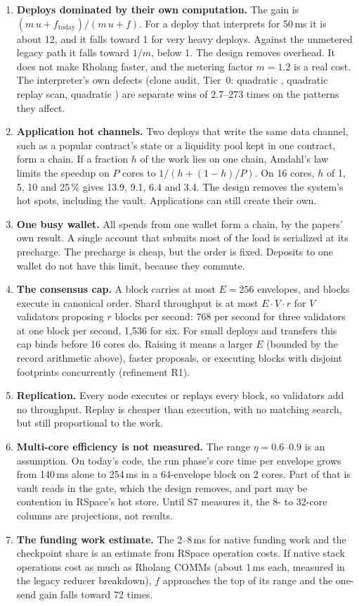 \documentclass[11pt]{article}
\newcommand{\code}{\path}
\begin{document}
\begin{enumerate}
\item \textbf{Deploys dominated by their own computation.} The gain is $(m\,u + f_{\mathrm{today}})/(m\,u + f)$. For a deploy that interprets for 50\,ms it is about 12, and it falls toward 1 for very heavy deploys. Against the unmetered legacy path it falls toward $1/m$, below 1. The design removes overhead. It does not make Rholang faster, and the metering factor $m = 1.2$ is a real cost. The interpreter's own defects (clone audit, Tier~0: quadratic \code{Env::put}, quadratic replay scan, quadratic \code{eval_match}) are separate wins of 2.7--273 times on the patterns they affect.
\item \textbf{Application hot channels.} Two deploys that write the same data channel, such as a popular contract's state or a liquidity pool kept in one contract, form a chain. If a fraction $h$ of the work lies on one chain, Amdahl's law limits the speedup on $P$ cores to $1/(h + (1-h)/P)$. On 16 cores, $h$ of 1, 5, 10 and 25\,\% gives 13.9, 9.1, 6.4 and 3.4. The design removes the system's hot spots, including the vault. Applications can still create their own.
\item \textbf{One busy wallet.} All spends from one wallet form a chain, by the papers' own result. A single account that submits most of the load is serialized at its precharge. The precharge is cheap, but the order is fixed. Deposits to one wallet do not have this limit, because they commute.
\item \textbf{The consensus cap.} A block carries at most $E = 256$ envelopes, and blocks execute in canonical order. Shard throughput is at most $E \cdot V \cdot r$ for $V$ validators proposing $r$ blocks per second: 768 per second for three validators at one block per second, 1{,}536 for six. For small deploys and transfers this cap binds before 16 cores do. Raising it means a larger $E$ (bounded by the record arithmetic above), faster proposals, or executing blocks with disjoint footprints concurrently (refinement R1).
\item \textbf{Replication.} Every node executes or replays every block, so validators add no throughput. Replay is cheaper than execution, with no matching search, but still proportional to the work.
\item \textbf{Multi-core efficiency is not measured.} The range $\eta = 0.6$--$0.9$ is an assumption. On today's code, the run phase's core time per envelope grows from 140\,ms alone to 254\,ms in a 64-envelope block on 2 cores. Part of that is vault reads in the gate, which the design removes, and part may be contention in RSpace's hot store. Until S7 measures it, the 8- to 32-core columns are projections, not results.
\item \textbf{The funding work estimate.} The 2--8\,ms for native funding work and the checkpoint share is an estimate from RSpace operation costs. If native stack operations cost as much as Rholang COMMs (about 1\,ms each, measured in the legacy reducer breakdown), $f$ approaches the top of its range and the one-send gain falls toward 72 times.
\end{enumerate}
\end{document}
